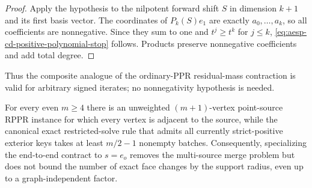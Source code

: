 \begin{proof}
Apply the hypothesis to the nilpotent forward shift $S$ in dimension
$k+1$ and its first basis vector.  The coordinates of
$P_k(S)e_1$ are exactly $a_0,\ldots,a_k$, so all coefficients are
nonnegative.  Since they sum to one and $t^j\geq t^k$ for $j\leq k$,
\cref{eq:aesp-cd-positive-polynomial-stop} follows.  Products preserve
nonnegative coefficients and add total degree.
\end{proof}

Thus the composite analogue of the ordinary-PPR residual-mass contraction is
valid for arbitrary signed iterates; no nonnegativity hypothesis is needed.

\begin{proposition}
\label{prop:aesp-cd-fan-linear-batches}
For every even $m\geq4$ there is an unweighted $(m+1)$-vertex point-source
RPPR instance for which every vertex is adjacent to the source, while the
canonical exact restricted-solve rule that admits all currently
strict-positive exterior keys takes at least $m/2-1$ nonempty batches.
Consequently, specializing the end-to-end contract to $s=e_o$ removes the
multi-source merge problem but does not bound the number of exact face
changes by the support radius, even up to a graph-independent factor.
\end{proposition}

